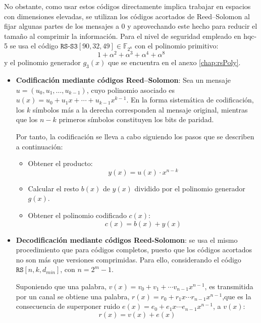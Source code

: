 No obstante, como usar estos códigos directamente implica trabajar en espacios con dimensiones elevadas, se utilizan los códigos acortados de Reed--Solomon al fijar algunas partes de los mensajes a \(0\) y aprovechando este hecho para reducir el tamaño al comprimir la información. 
Para el nivel de seguridad empleado en \acrshort{hqc}-5 se usa el código \(\texttt{RS-S3}[90,32,49] \in \mathbb{F}_{2^8}\) con el polinomio primitivo:
\begin{equation}
	1+\alpha^2+\alpha^3+\alpha^4+\alpha^8
\end{equation}
y el polinomio generador \(g_3(x)\) que se encuentra en el anexo \ref{chap:rsPoly}.
\begin{itemize}
	\item \textbf{Codificación mediante códigos Reed–Solomon}:
	Sea un mensaje	$u = (u_0, u_1, \ldots, u_{k-1})$, cuyo polinomio asociado es	$u(x) = u_0 + u_1x + \cdots + u_{k-1}x^{k-1}$.	En la forma sistemática de codificación, los \(k\) símbolos más a la derecha corresponden al mensaje original, mientras que los \(n-k\) primeros símbolos constituyen los bits de paridad.  
	\newline
	
	Por tanto, la codificación se lleva a cabo siguiendo los pasos que se describen a continuación:
	\begin{itemize}
		\item Obtener el producto:
		\begin{equation}
			y(x)=u(x)\cdot x^{n-k}
		\end{equation}
		\item  Calcular el resto \(b(x)\) de \(y(x)\) dividido por el polinomio generador \(g(x)\).
		\item  Obtener el polinomio codificado \(c(x)\):
		\begin{equation}
			c(x)=b(x)+y(x)
		\end{equation}
	\end{itemize}
	\item \textbf{Decodificación mediante códigos Reed-Solomon}: se usa el mismo procedimiento que para códigos completos, puesto que los códigos acortados no son más que versiones comprimidas. Para ello, considerando el código \(\texttt{RS}[n,k,d_{min}]\), con \(n=2^m-1\).
	\newline
	
	Suponiendo que una palabra, \(v(x)=v_0+v_1+\cdots v_{n-1}x^{n-1}\), es transmitida por un canal  se obtiene una palabra, \(r(x)=r_0+r_1x\cdots r_{n-1}x^{n-1}\),que es la consecuencia de superponer ruido \(e(x)=e_0+e_1x\cdots e_{n-1}x^{n-1}\), a \(v(x)\):
	\begin{equation}
		r(x)=v(x)+e(x)
	\end{equation}
	

\end{itemize}
